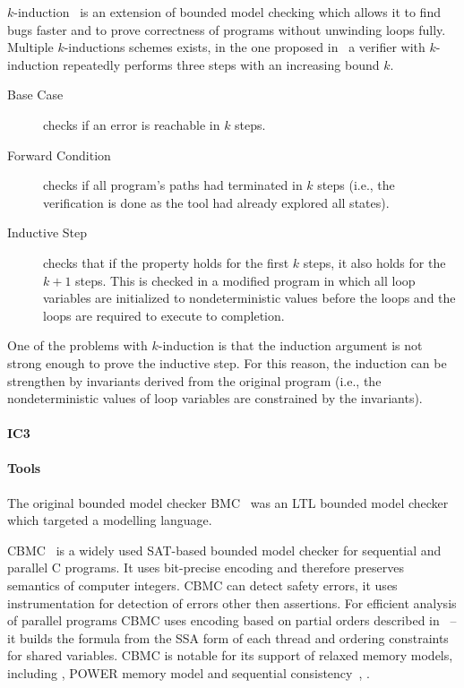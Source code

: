 $k$-induction~\cite{Donaldson2011,Gadelha2017} is an extension of
bounded model checking which allows it to find bugs faster and to prove
correctness of programs without unwinding loops fully.
Multiple $k$-inductions schemes exists, in the one proposed in~\cite{Gadelha2017} a verifier with $k$-induction repeatedly performs three steps with an increasing bound $k$.
\begin{description}
    \item[Base Case] checks if an error is reachable in $k$ steps.
    \item[Forward Condition] checks if all program's paths had terminated in
        $k$ steps (i.e., the verification is done as the tool had already
        explored all states).
    \item[Inductive Step] checks that if the property holds for the first $k$
        steps, it also holds for the $k+1$ steps.
        This is checked in a modified program in which all loop variables are
        initialized to nondeterministic values before the loops and the loops
        are required to execute to completion.
\end{description}
One of the problems with $k$-induction is that the induction argument is not strong enough to prove the inductive step.
For this reason, the induction can be strengthen by invariants derived from the original program (i.e., the nondeterministic values of loop variables are constrained by the invariants).

\paragraph{IC3} 


\paragraph{Tools}

The original bounded model checker BMC~\cite{Biere1999} was an LTL bounded
model checker which targeted a modelling language.


CBMC~\cite{Clarke2004,Kroening2014} is a widely used SAT-based bounded
model checker for sequential and parallel C programs.
It uses bit-precise encoding and therefore preserves semantics of computer
integers.
CBMC can detect safety errors, it uses instrumentation for detection of errors
other then assertions.
For efficient analysis of parallel programs CBMC uses encoding based on partial
orders described in~\cite{Alglave2013po} -- it builds the formula from the SSA
form of each thread and ordering constraints for shared variables.
CBMC is notable for its support of relaxed memory models, including \xtso,
POWER memory model and sequential consistency~\cite{Alglave2013po}, .

